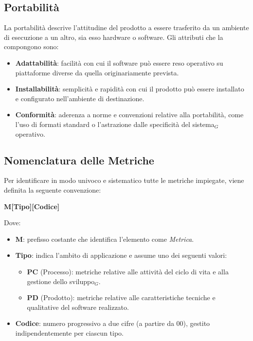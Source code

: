 \documentclass[a4paper, 10pt]{article}
\begin{document}
\subsection{Portabilità}
\label{subsec:portabilita}

La portabilità descrive l'attitudine del prodotto a essere trasferito da un ambiente di esecuzione a un altro, sia esso hardware o software. Gli attributi che la compongono sono:
\begin{itemize}
    \item \textbf{Adattabilità}: facilità con cui il software può essere reso operativo su piattaforme diverse da quella originariamente prevista.
    \item \textbf{Installabilità}: semplicità e rapidità con cui il prodotto può essere installato e configurato nell'ambiente di destinazione.
    \item \textbf{Conformità}: aderenza a norme e convenzioni relative alla portabilità, come l'uso di formati standard o l'astrazione dalle specificità del sistema$_G$ operativo.
\end{itemize}

\subsection{Nomenclatura delle Metriche}

Per identificare in modo univoco e sistematico tutte le metriche impiegate, viene definita la seguente convenzione:

\begin{center}
    \textbf{M[Tipo][Codice]}
\end{center}

Dove:
\begin{itemize}
    \item \textbf{M}: prefisso costante che identifica l'elemento come \textit{Metrica}.
    \item \textbf{Tipo}: indica l'ambito di applicazione e assume uno dei seguenti valori:
    \begin{itemize}
        \item \textbf{PC} (Processo): metriche relative alle attività del ciclo di vita e alla gestione dello sviluppo$_G$.
        \item \textbf{PD} (Prodotto): metriche relative alle caratteristiche tecniche e qualitative del software realizzato.
    \end{itemize}
    \item \textbf{Codice}: numero progressivo a due cifre (a partire da 00), gestito indipendentemente per ciascun tipo.
\end{itemize}
\end{document}
